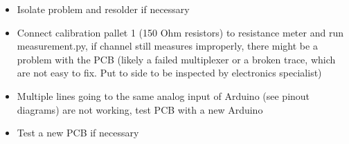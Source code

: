 \documentclass[letterpaper,12pt]{article}
\begin{document}
\begin{enumerate}
\begin{itemize}
		\item Isolate problem and resolder if necessary
		\item Connect calibration pallet 1 (150 Ohm resistors) to resistance meter and run measurement.py, if channel still measures improperly, there might be a problem with the PCB (likely a failed multiplexer or a broken trace, which are not easy to fix. Put to side to be inspected by electronics specialist)
		\item Multiple lines going to the same analog input of Arduino (see pinout diagrams) are not working, test PCB with a new Arduino
		\item Test a new PCB if necessary
	\end{itemize}
\end{enumerate}

\end{document}

